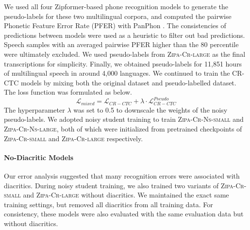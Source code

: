 \documentclass[11pt]{article}
\begin{document}
We used all four Zipformer-based phone recognition models to generate the pseudo-labels for these two multilingual corpora, and computed the pairwise Phonetic Feature Error Rate (PFER) with PanPhon \cite{mortensen-etal-2016-panphon}. The consistencies of predictions between models were used as a heuristic to filter out bad predictions. Speech samples with an averaged pairwise PFER higher than the 80 percentile were ultimately excluded. We used pseudo-labels from \textsc{Zipa-Cr-large} as the final transcriptions for simplicity. Finally, we obtained pseudo-labels for 11,851 hours of multilingual speech in around 4,000 languages. We continued to train the CR-CTC models by mixing both the original dataset and pseudo-labelled dataset. The loss function was formulated as below.
$$
\mathcal{L}_{mixed} = \mathcal{L}_{CR-CTC} + \lambda\cdot\mathcal{L}_{CR-CTC}^{Pseudo}
$$
The hyperparameter $\lambda$ was set to 0.5 to downscale the weights of the noisy pseudo-labels. We adopted noisy student training to train \textsc{Zipa-Cr-Ns-small} and \textsc{Zipa-Cr-Ns-large}, both of which were initialized from pretrained checkpoints of \textsc{Zipa-Cr-small} and \textsc{Zipa-Cr-large} respectively. 

\paragraph{No-Diacritic Models} Our error analysis suggested that many recognition errors were associated with diacritics. During noisy student training, we also trained two variants of  \textsc{Zipa-Cr-small} and \textsc{Zipa-Cr-large} without diacritics. We maintained the exact same training settings, but removed all diacritics from all training data. For consistency, these models were also evaluated with the same evaluation data but without diacritics.  
\end{document}
